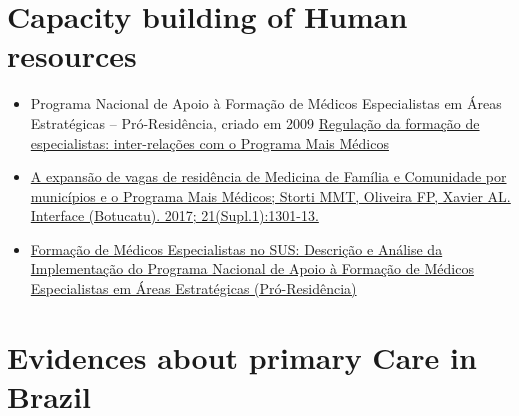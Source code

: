 \documentclass[]{book}
\begin{document}
\hypertarget{capacity-building-of-human-resources}{%
\section*{Capacity building of Human resources}\label{capacity-building-of-human-resources}}

\begin{itemize}
\item
  Programa Nacional de Apoio à Formação de Médicos Especialistas em Áreas Estratégicas -- Pró-Residência, criado em 2009 \href{http://www.scielo.br/pdf/physis/v26n2/0103-7331-physis-26-02-00633.pdf}{Regulação da formação de especialistas: inter-relações com o Programa Mais Médicos}
\item
  \href{http://www.scielo.br/pdf/icse/v21s1/1807-5762-icse-21-s1-1301.pdf}{A expansão de vagas de residência de Medicina de Família e Comunidade por municípios e o Programa Mais Médicos; Storti MMT, Oliveira FP, Xavier AL. Interface (Botucatu). 2017; 21(Supl.1):1301-13.}
\item
  \href{http://www.scielo.br/pdf/rbem/v37n1/11.pdf}{Formação de Médicos Especialistas no SUS: Descrição e Análise da Implementação do Programa Nacional de Apoio à Formação de Médicos Especialistas em Áreas Estratégicas (Pró-Residência)}
\end{itemize}

\hypertarget{evidences-about-primary-care-in-brazil}{%
\section*{Evidences about primary Care in Brazil}\label{evidences-about-primary-care-in-brazil}}
\end{document}
